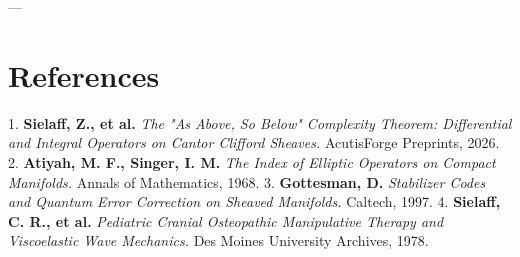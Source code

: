 \documentclass[11pt,twocolumn]{article}
\begin{document}
---

\section{References}
1. \textbf{Sielaff, Z., et al.} \textit{The "As Above, So Below" Complexity Theorem: Differential and Integral Operators on Cantor Clifford Sheaves.} AcutisForge Preprints, 2026.
2. \textbf{Atiyah, M. F., Singer, I. M.} \textit{The Index of Elliptic Operators on Compact Manifolds.} Annals of Mathematics, 1968.
3. \textbf{Gottesman, D.} \textit{Stabilizer Codes and Quantum Error Correction on Sheaved Manifolds.} Caltech, 1997.
4. \textbf{Sielaff, C. R., et al.} \textit{Pediatric Cranial Osteopathic Manipulative Therapy and Viscoelastic Wave Mechanics.} Des Moines University Archives, 1978.
\end{document}

